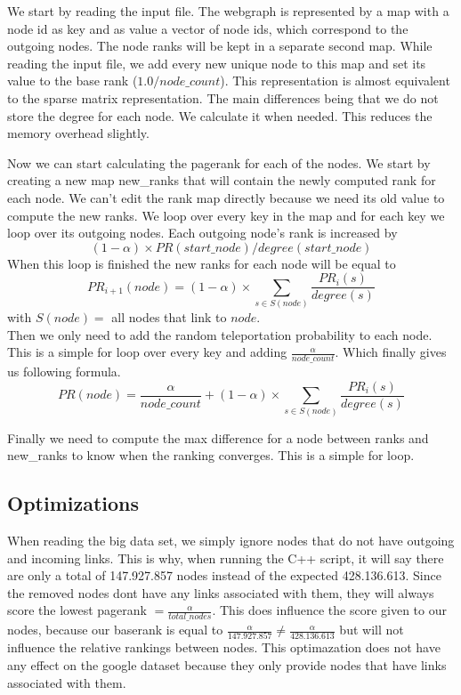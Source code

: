 \documentclass{article}
\begin{document}
We start by reading the input file. The webgraph is represented by a map with a node id as key and as value a vector of node ids, which correspond to the outgoing nodes. The node ranks will be kept in a separate second map. While reading the input file, we add every new unique node to this map and set its value to the base rank ($1.0 / node\_count$). This representation is almost equivalent to the sparse matrix representation. The main differences being that we do not store the degree for each node. We calculate it when needed. This reduces the memory overhead slightly.

Now we can start calculating the pagerank for each of the nodes. We start by creating a new map new\_ranks that will contain the newly computed rank for each node. We can't edit the rank map directly because we need its old value to compute the new ranks. We loop over every key in the map and for each key we loop over its outgoing nodes. Each outgoing node's rank is increased by
$$ (1-\alpha) \times PR(start\_node) / degree(start\_node) $$
When this loop is finished the new ranks for each node will be equal to 
$$ PR_{i+1}(node) = (1-\alpha) \times \sum_{s \in S(node)} \frac{PR_i(s)}{degree(s)}  $$
with $S(node) =$ all nodes that link to $node$.\\
Then we only need to add the random teleportation probability to each node. This is a simple for loop over every key and adding $ \frac{\alpha}{node\_count}$. Which finally gives us following formula.
$$PR(node) = \frac{\alpha}{node\_count} + (1 - \alpha) \times \sum_{s \in S(node)} \frac{PR_i(s)}{degree(s)}$$

Finally we need to compute the max difference for a node between ranks and new\_ranks to know when the ranking converges. This is a simple for loop.

\subsection{Optimizations}
When reading the big data set, we simply ignore nodes that do not have outgoing and incoming links. This is why, when running the C++ script, it will say there are only a total of 147.927.857 nodes instead of the expected 428.136.613. Since the removed nodes dont have any links associated with them, they will always score the lowest pagerank $ = \frac{\alpha}{total\_nodes}$. This does influence the score given to our nodes, because our baserank is equal to $ \frac{\alpha}{147.927.857} \neq \frac{\alpha}{428.136.613}$ but will not influence the relative rankings between nodes. This optimazation does not have any effect on the google dataset because they only provide nodes that have links associated with them.
\end{document}
